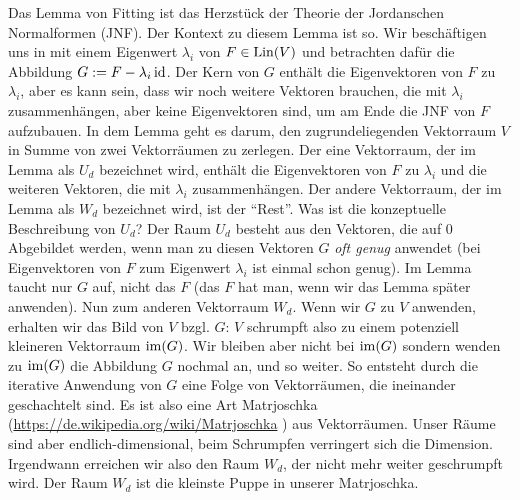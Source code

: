 Das Lemma von Fitting ist das Herzstück der Theorie der Jordanschen Normalformen (JNF). Der Kontext zu diesem Lemma ist so. Wir beschäftigen uns in mit einem Eigenwert $\lambda_i$ von $F \in \operatorname{Lin}(V)$ und betrachten dafür die Abbildung $G := F - \lambda_i \operatorname{id}$. Der Kern von $G$ enthält die Eigenvektoren von $F$ zu $\lambda_i$, aber es kann sein, dass wir noch weitere Vektoren brauchen, die mit $\lambda_i$ zusammenhängen, aber keine Eigenvektoren sind, um am Ende die JNF von $F$ aufzubauen. In dem Lemma geht es darum, den zugrundeliegenden Vektorraum $V$ in Summe von zwei Vektorräumen zu zerlegen. Der eine Vektorraum, der im Lemma als $U_d$ bezeichnet wird, enthält die Eigenvektoren von $F$ zu $\lambda_i$  und die weiteren Vektoren, die mit $\lambda_i$ zusammenhängen. Der andere Vektorraum, der im Lemma als $W_d$ bezeichnet wird, ist der ``Rest''. Was ist die konzeptuelle Beschreibung von $U_d$? Der Raum $U_d$ besteht aus den Vektoren, die auf $0$ Abgebildet werden, wenn man zu diesen Vektoren $G$ \emph{oft genug} anwendet (bei Eigenvektoren von $F$ zum Eigenwert $\lambda_i$ ist einmal schon genug). Im Lemma taucht nur $G$ auf, nicht das $F$ (das $F$ hat man, wenn wir das Lemma später anwenden). Nun zum anderen Vektorraum $W_d$. Wenn wir $G$ zu $V$ anwenden, erhalten wir das Bild von $V$ bzgl. $G$: $V$ schrumpft also zu einem potenziell kleineren Vektorraum $\operatorname{im}(G)$. Wir bleiben aber nicht bei $\operatorname{im}(G)$ sondern wenden zu $\operatorname{im}(G)$ die Abbildung $G$ nochmal an, und so weiter. So entsteht durch die iterative Anwendung von $G$  eine Folge von Vektorräumen, die ineinander geschachtelt sind. Es ist also eine Art Matrjoschka (\url{https://de.wikipedia.org/wiki/Matrjoschka} ) aus Vektorräumen. Unser Räume sind aber endlich-dimensional, beim Schrumpfen verringert sich die Dimension. Irgendwann erreichen wir also den Raum $W_d$, der nicht mehr weiter geschrumpft wird. Der Raum $W_d$ ist die kleinste Puppe in unserer Matrjoschka. 


